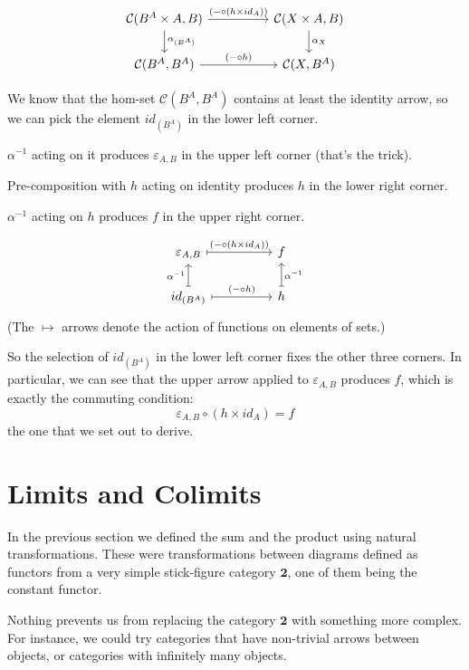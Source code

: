 \documentclass[DaoFP]{subfiles}
\begin{document}
\[
 \begin{tikzcd}
 \mathcal{C}(B^A \times A, B)
 \arrow[rr, "(- \circ (h \times id_A))"]
 \arrow[d,  "\alpha_{(B^A)}"]
& &
\mathcal{C}(X \times A, B)
  \arrow[d,  "\alpha_X"]
 \\
 \mathcal{C}(B^A, B^A)
 \arrow[rr, "(- \circ h)"]
& &
\mathcal{C}(X, B^A)
 \end{tikzcd}
\]

We know that the hom-set $\mathcal{C}(B^A, B^A)$ contains at least the identity arrow, so we can pick the element $id_{(B^A)}$ in the lower left corner. 

$\alpha^{-1}$ acting on it produces $\varepsilon_{A, B}$ in the upper left corner (that's the  trick). 

Pre-composition with $h$ acting on identity produces $h$ in the lower right corner. 

$\alpha^{-1}$ acting on $h$ produces $f$ in the upper right corner. 

\[
 \begin{tikzcd}[
  every arrow/.style={draw,mapsto}
]
 \varepsilon_{A, B}
 \arrow[rr, "(- \circ (h \times id_A))"]
& &
f
 \\
 id_{(B^A)}
 \arrow[u, "\alpha^{-1}"]
 \arrow[rr, "(- \circ h)"]
& &
h
\arrow[u, "\alpha^{-1}"']
 \end{tikzcd}
\]
(The $\mapsto$ arrows denote the action of functions on elements of sets.)


So the selection of $id_{(B^A)}$ in the lower left corner fixes the other three corners. In particular, we can see that the upper arrow applied to $\varepsilon_{A, B}$ produces $f$, which is exactly the commuting condition:
\[ \varepsilon_{A, B} \circ (h \times id_A) = f \]
the one that we set out to derive.

\section{Limits and Colimits}

In the previous section we defined the sum and the product using natural transformations. These were transformations between diagrams defined as functors from a very simple stick-figure category $\mathbf{2}$, one of them being the constant functor. 

Nothing prevents us from replacing the category $\mathbf{2}$ with something more complex. For instance, we could try categories that have non-trivial arrows between objects, or categories with infinitely many objects. 
\end{document}
